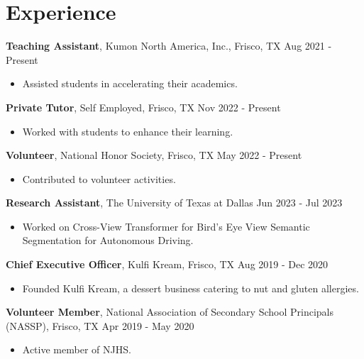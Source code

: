 \documentclass[a4paper, 10pt]{article}
\begin{document}
\section*{Experience}
\textbf{Teaching Assistant}, Kumon North America, Inc., Frisco, TX \hfill Aug 2021 - Present
\begin{itemize}[left=0pt, itemsep=0pt]
    \item Assisted students in accelerating their academics.
\end{itemize}

\vspace{12pt}

\textbf{Private Tutor}, Self Employed, Frisco, TX \hfill Nov 2022 - Present
\begin{itemize}[left=0pt, itemsep=0pt]
    \item Worked with students to enhance their learning.
\end{itemize}

\vspace{12pt}

\textbf{Volunteer}, National Honor Society, Frisco, TX \hfill May 2022 - Present
\begin{itemize}[left=0pt, itemsep=0pt]
    \item Contributed to volunteer activities.
\end{itemize}

\vspace{12pt}

\textbf{Research Assistant}, The University of Texas at Dallas \hfill Jun 2023 - Jul 2023
\begin{itemize}[left=0pt, itemsep=0pt]
    \item Worked on Cross-View Transformer for Bird’s Eye View Semantic Segmentation for Autonomous Driving.
\end{itemize}

\vspace{12pt}

\textbf{Chief Executive Officer}, Kulfi Kream, Frisco, TX \hfill Aug 2019 - Dec 2020
\begin{itemize}[left=0pt, itemsep=0pt]
    \item Founded Kulfi Kream, a dessert business catering to nut and gluten allergies.
\end{itemize}

\vspace{12pt}

\textbf{Volunteer Member}, National Association of Secondary School Principals (NASSP), Frisco, TX \hfill Apr 2019 - May 2020
\begin{itemize}[left=0pt, itemsep=0pt]
    \item Active member of NJHS.
\end{itemize}
\end{document}
